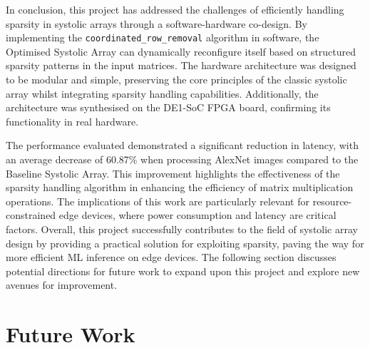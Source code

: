 \documentclass[12pt, a4paper, ukenglish]{article}
\begin{document}
    In conclusion, this project has addressed the challenges of efficiently handling sparsity in systolic arrays through a software-hardware co-design. By implementing the \newline \texttt{coordinated\_row\_removal} algorithm in software, the Optimised Systolic Array can dynamically reconfigure itself based on structured sparsity patterns in the input matrices. The hardware architecture was designed to be modular and simple, preserving the core principles of the classic systolic array whilst integrating sparsity handling capabilities. Additionally, the architecture was synthesised on the DE1-SoC FPGA board, confirming its functionality in real hardware. 

    The performance evaluated demonstrated a significant reduction in latency, with an average decrease of 60.87\% when processing AlexNet images compared to the Baseline Systolic Array. This improvement highlights the effectiveness of the sparsity handling algorithm in enhancing the efficiency of matrix multiplication operations. The implications of this work are particularly relevant for resource-constrained edge devices, where power consumption and latency are critical factors. Overall, this project successfully contributes to the field of systolic array design by providing a practical solution for exploiting sparsity, paving the way for more efficient ML inference on edge devices. The following section discusses potential directions for future work to expand upon this project and explore new avenues for improvement.




\section{Future Work} \label{sec: future work}
\end{document}
